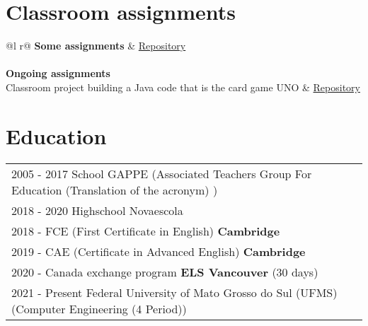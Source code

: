 \documentclass[a4paper,12pt]{article}
\begin{document}
\section{Classroom assignments}

\begin{tabularx}{\linewidth}{ @{}l r@{} }
\textbf{Some assignments} & \hfill \href{https://github.com/Joao-Schio/T2}{Repository} \\[3.75pt]
  \\
\textbf{Ongoing assignments}\\{Classroom project building a Java code that is the card game UNO} & \hfill \href{https://github.com/Joao-Schio/UnoOO}{Repository} 
\end{tabularx}

\section{Education}
\begin{tabularx}{\linewidth}{@{}l X@{}}	

2005 - 2017 School GAPPE (Associated Teachers Group For Education (Translation of the acronym) ) \\

2018 - 2020 Highschool Novaescola\\

2018 - FCE (First Certificate in English)  \textbf{Cambridge} \\


2019 - CAE (Certificate in Advanced English)   \textbf{Cambridge} \\

2020 - Canada exchange program   \textbf{ELS Vancouver} \hfill  (30 days) \\

2021 - Present Federal University of Mato Grosso do Sul (UFMS) (Computer Engineering (4 Period)) \\
\end{tabularx}

\end{document}
